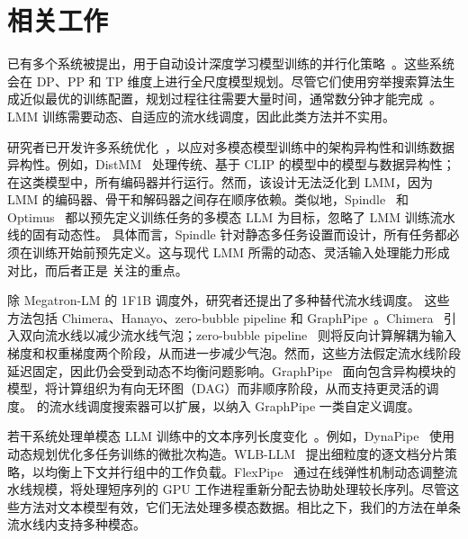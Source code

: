 \section{相关工作}

已有多个系统被提出，用于自动设计深度学习模型训练的并行化策略~\cite{alpa-osdi22,nnscaler-osdi24,unity-osdi22}。这些系统会在 DP、PP 和 TP 维度上进行全尺度模型规划。尽管它们使用穷举搜索算法生成近似最优的训练配置，规划过程往往需要大量时间，通常数分钟才能完成~\cite{nnscaler-osdi24}。LMM 训练需要动态、自适应的流水线调度，因此此类方法并不实用。

研究者已开发许多系统优化~\cite{distmm-nsdi24,optimus-atc25,disttrain-arxiv24,spindle-asplos25,orch-mllm-arxiv25,cornstarch-arxiv25,diffusionpipe-mlsys24}，以应对多模态模型训练中的架构异构性和训练数据异构性。例如，DistMM~\cite{distmm-nsdi24} 处理传统、基于 CLIP 的模型中的模型与数据异构性；在这类模型中，所有编码器并行运行。然而，该设计无法泛化到 LMM，因为 LMM 的编码器、骨干和解码器之间存在顺序依赖。类似地，Spindle~\cite{spindle-asplos25} 和 Optimus~\cite{optimus-atc25} 都以预先定义训练任务的多模态 LLM 为目标，忽略了 LMM 训练流水线的固有动态性。
具体而言，Spindle 针对静态多任务设置而设计，所有任务都必须在训练开始前预先定义。这与现代 LMM 所需的动态、灵活输入处理能力形成对比，而后者正是 \sys{} 关注的重点。

除 Megatron-LM 的 1F1B 调度外，研究者还提出了多种替代流水线调度。\newline
这些方法包括 Chimera、Hanayo、zero-bubble pipeline 和 GraphPipe~\cite{chimera-sc21,hanayo-sc23,zero-bubble-iclr24,graph-pipe-asplos25}。Chimera~\cite{chimera-sc21} 引入双向流水线以减少流水线气泡；zero-bubble pipeline~\cite{zero-bubble-iclr24} 则将反向计算解耦为输入梯度和权重梯度两个阶段，从而进一步减少气泡。然而，这些方法假定流水线阶段延迟固定，因此仍会受到动态不均衡问题影响。GraphPipe~\cite{graph-pipe-asplos25} 面向包含异构模块的模型，将计算组织为有向无环图（DAG）而非顺序阶段，从而支持更灵活的调度。\sys{} 的流水线调度搜索器可以扩展，以纳入 GraphPipe 一类自定义调度。

若干系统处理单模态 LLM 训练中的文本序列长度变化~\cite{wlb-llm-osdi25,dynapipe-eurosys24,flexpipe-atc25,byte-transformer-ipdps23,sppo-arxiv25}。例如，DynaPipe~\cite{dynapipe-eurosys24} 使用动态规划优化多任务训练的微批次构造。WLB-LLM~\cite{wlb-llm-osdi25} 提出细粒度的逐文档分片策略，以均衡上下文并行组中的工作负载。FlexPipe~\cite{flexpipe-atc25} 通过在线弹性机制动态调整流水线规模，将处理短序列的 GPU 工作进程重新分配去协助处理较长序列。尽管这些方法对文本模型有效，它们无法处理多模态数据。相比之下，我们的方法在单条流水线内支持多种模态。
